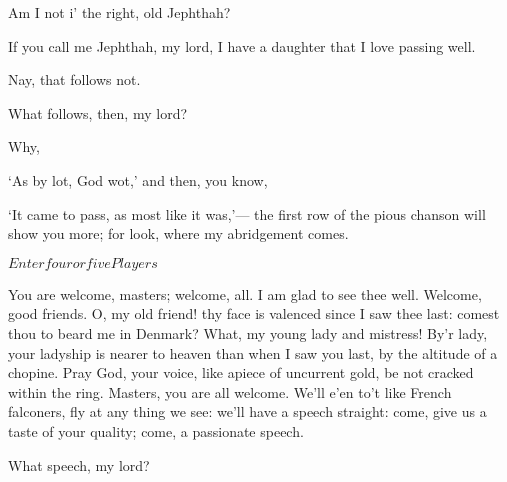 \documentclass[11pt]{book}
\newenvironment {song}[1][0]
 {\Versus 
  \Locus \textus {+7em+#1em} 
  \Forma \strophae {01}
 }
 {\endVersus}
\begin{document}
\1	Am I not i' the right, old Jephthah?

\5	If you call me Jephthah, my lord, I have a daughter
	that I love passing well.

\1	Nay, that follows not.

\5	What follows, then, my lord?


\1	Why,
\begin{song}[-4]
	`As by lot, God wot,'
\end{song}
 and then, you know,
\begin{song}[-4]
	`It came to pass, as most like it was,'---
\end{song}
	the first row of the pious chanson will show you
	more; for look, where my abridgement comes.

	\(Enter four or five Players\)

	You are welcome, masters; welcome, all. I am glad
	to see thee well. Welcome, good friends. O, my old
	friend! thy face is valenced since I saw thee last:
	comest thou to beard me in Denmark? What, my young
	lady and mistress! By'r lady, your ladyship is
	nearer to heaven than when I saw you last, by the
	altitude of a chopine. Pray God, your voice, like
	apiece of uncurrent gold, be not cracked within the
	ring. Masters, you are all welcome. We'll e'en
	to't like French falconers, fly at any thing we see:
	we'll have a speech straight: come, give us a taste
	of your quality; come, a passionate speech.

	What speech, my lord?
\end{document}
